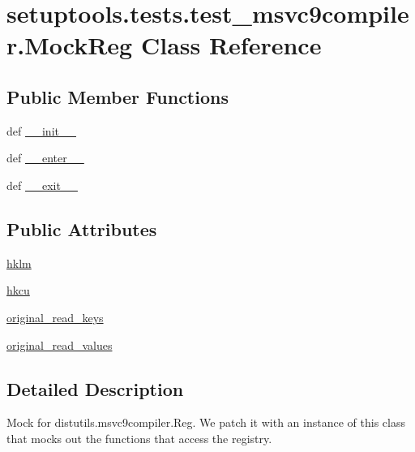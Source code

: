 \hypertarget{classsetuptools_1_1tests_1_1test__msvc9compiler_1_1MockReg}{}\section{setuptools.\+tests.\+test\+\_\+msvc9compiler.\+Mock\+Reg Class Reference}
\label{classsetuptools_1_1tests_1_1test__msvc9compiler_1_1MockReg}
\subsection*{Public Member Functions}
\begin{DoxyCompactItemize}
\item 
def \hyperlink{classsetuptools_1_1tests_1_1test__msvc9compiler_1_1MockReg_aa2aeffd76b789d80cbcf2549ee45fcce}{\+\_\+\+\_\+init\+\_\+\+\_\+}
\item 
def \hyperlink{classsetuptools_1_1tests_1_1test__msvc9compiler_1_1MockReg_a62ad6e079847bfe258086766df3fa64e}{\+\_\+\+\_\+enter\+\_\+\+\_\+}
\item 
def \hyperlink{classsetuptools_1_1tests_1_1test__msvc9compiler_1_1MockReg_acbee84be7a1ff5a64fd4edfc623b3a32}{\+\_\+\+\_\+exit\+\_\+\+\_\+}
\end{DoxyCompactItemize}
\subsection*{Public Attributes}
\begin{DoxyCompactItemize}
\item 
\hyperlink{classsetuptools_1_1tests_1_1test__msvc9compiler_1_1MockReg_a3eef7f7e19b3cc8e0715cdd67d9387dd}{hklm}
\item 
\hyperlink{classsetuptools_1_1tests_1_1test__msvc9compiler_1_1MockReg_aee69bba572987f562d78ba805593ae3f}{hkcu}
\item 
\hyperlink{classsetuptools_1_1tests_1_1test__msvc9compiler_1_1MockReg_ae845a7f6150dce538ec194abdc75c882}{original\+\_\+read\+\_\+keys}
\item 
\hyperlink{classsetuptools_1_1tests_1_1test__msvc9compiler_1_1MockReg_a4b782f0bed883974e885d70d9a5bd48b}{original\+\_\+read\+\_\+values}
\end{DoxyCompactItemize}


\subsection{Detailed Description}
\begin{DoxyVerb}Mock for distutils.msvc9compiler.Reg. We patch it
with an instance of this class that mocks out the
functions that access the registry.
\end{DoxyVerb}
 

